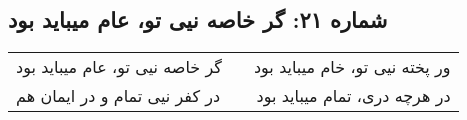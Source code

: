 \begin{center}
\section*{شماره ۲۱: گر خاصه نیی تو، عام میباید بود}
\label{sec:021}
\begin{longtable}{l p{0.5cm} r}
گر خاصه نیی تو، عام میباید بود
&&
ور پخته نیی تو، خام میباید بود
\\
در کفر نیی تمام و در ایمان هم
&&
در هرچه دری، تمام میباید بود
\\
\end{longtable}
\end{center}
